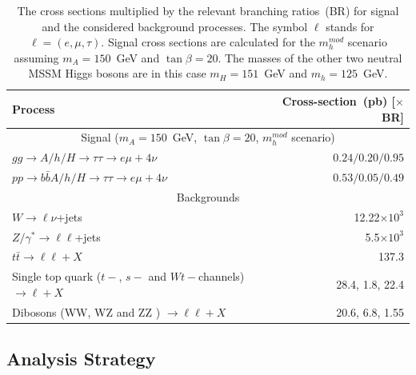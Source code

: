 \begin{table}[!tp]
\begin{center}
\begin{small}
\begin{tabular}{lr}
\hline \hline
Process                                                                 & Cross-section~(pb) [$\times$ BR] \\ [1pt]
\hline
\multicolumn{2}{c}{Signal ($m_A=150$~GeV, $\tan\beta=20$, $m_{h}^{mod}$ scenario) }  \\ [1pt]

$gg\rightarrow A/h/H \rightarrow\tau\tau \rightarrow e\mu+ 4\nu$                 &  $0.24 /0.20 / 0.95 $ \\
$pp \rightarrow b\bar{b}A/h/H \rightarrow \tau\tau \rightarrow e\mu + 4\nu$       & $0.53 /0.05 / 0.49   $ \\[1pt]
\hline
\multicolumn{2}{c}{Backgrounds} \\[1pt]
$W\rightarrow \ell \nu$+jets                           & 12.22$\times 10^3$ \\
$Z/\gamma^{*}\rightarrow \ell\ell$+jets       & 5.5$\times 10^3$ \\
$t\bar{t} \rightarrow \ell \ell + X$                                                              & 137.3 \\
Single top quark ($t-$, $s-$ and $Wt-$channels) $\rightarrow \ell + X$               & 28.4, 1.8, 22.4 \\
Dibosons (WW, WZ and ZZ ) $\rightarrow \ell \ell+ X$                                          & 20.6, 6.8, 1.55 \\ [1pt]
\hline 
\hline
\end{tabular}
\end{small}
\caption{The cross sections multiplied by the relevant branching ratios~(BR) for signal and the considered
background processes. The symbol $\ell$ stands for $\ell= (e, \mu, \tau)$. 
Signal cross sections are calculated for the $m_{h}^{mod}$ scenario assuming
 $m_A=150$~GeV and $\tan\beta=20$. The masses of the other two neutral MSSM Higgs bosons are 
	in this case  $m_H=151$~GeV and $m_h=125$~GeV.}
 \label{tab:MCxsec}

\end{center}
\end{table}


\subsection{Analysis Strategy} \label{sec:strategy}


